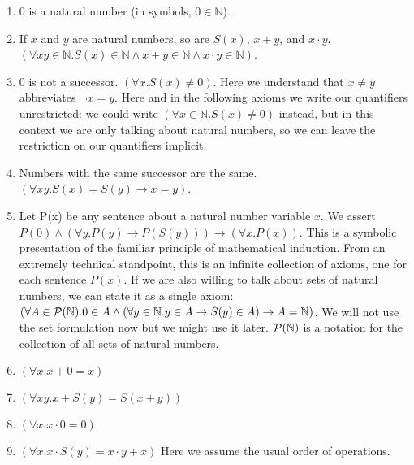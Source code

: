 \documentclass[12pt]{article}
\begin{document}
\begin{enumerate}

\item 0 is a natural number (in symbols, $0 \in {\mathbb N}$).

\item If $x$ and $y$ are natural numbers, so are $S(x)$, $x+y$, and $x
\cdot y$.  $(\forall xy \in {\mathbb N}.S(x) \in {\mathbb N} \wedge
x+y \in {\mathbb N} \wedge x \cdot y \in {\mathbb N})$.

\item 0 is not a successor.  $(\forall x.S(x) \neq 0)$.  Here we
understand that $x\neq y$ abbreviates $\neg x=y$.  Here and in the
following axioms we write our quantifiers unrestricted: we could write
$(\forall x \in {\mathbb N}.S(x) \neq 0)$ instead, but in this context
we are only talking about natural numbers, so we can leave the
restriction on our quantifiers implicit.

\item Numbers with the same successor are the same.  $(\forall xy.S(x)
= S(y) \rightarrow x=y)$.

\item Let P(x) be any sentence about a natural number variable $x$.
We assert $P(0) \wedge (\forall y.P(y) \rightarrow P(S(y)))
\rightarrow (\forall x.P(x))$.  This is a symbolic presentation of the
familiar principle of mathematical induction.  From an extremely
technical standpoint, this is an infinite collection of axioms, one
for each sentence $P(x)$.  If we are also willing to talk about sets
of natural numbers, we can state it as a single axiom: $(\forall A \in
{\cal P}({\mathbb N}).0 \in A \wedge (\forall y \in {\mathbb N}.y \in
A \rightarrow S(y) \in A) \rightarrow A = {\mathbb N})$.  We will not
use the set formulation now but we might use it later.  ${\cal
P}({\mathbb N})$ is a notation for the collection of all sets of
natural numbers.

\item $(\forall x.x+0=x)$

\item $(\forall xy.x+S(y)=S(x+y))$

\item $(\forall x.x\cdot 0 = 0)$

\item $(\forall x.x \cdot S(y) = x\cdot y +x)$  Here we assume the usual order of operations.

\end{enumerate}
\end{document}
